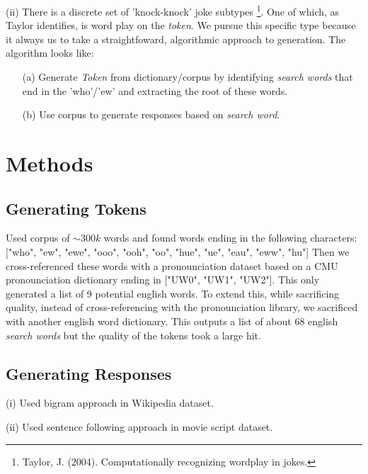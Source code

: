 \documentclass[twoside,twocolumn]{article}
\begin{document}
\noindent (ii) There is a discrete set of 'knock-knock' joke subtypes \footnote{Taylor, J. (2004). Computationally recognizing wordplay in jokes.}.
One of which, as Taylor identifies, is word play on the \emph{token}. We pursue this specific type because it always us to take a straightfoward, algorithmic approach to generation.
The algorithm looks like:
\begin{center}
    \begin{enumerate}
    \item[(a)] Generate \emph{Token} from dictionary/corpus by identifying \emph{search words} that end in the 'who'/'ew' and extracting the root of these words.
    \item[(b)] Use corpus to generate responses based on \emph{search word}.
    \end{enumerate}
\end{center}



\section{Methods}

\subsection{Generating Tokens}

Used corpus of $\sim 300k$ words and found words ending in the following characters: ["who", "ew", "ewe", "ooo", "ooh", "oo", "hue", "ue", "eau", "eww", "hu"]
Then we cross-referenced these words with a pronounciation dataset based on a CMU pronounciation dictionary ending in ["UW0", "UW1", "UW2"]. 
This only generated a list of 9 potential english words. To extend this, while sacrificing quality, instead of cross-referencing with the pronounciation library, we sacrificed with another english word dictionary. 
This outputs a list of about 68 english \emph{search words} but the quality of the tokens took a large hit.

\subsection{Generating Responses}

(i) Used bigram approach in Wikipedia dataset.

(ii) Used sentence following approach in movie script dataset.

\end{document}
